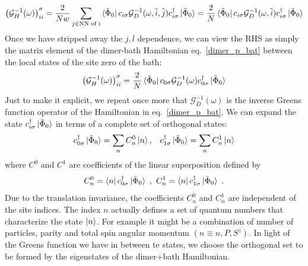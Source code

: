\documentclass{article}
\numberwithin{equation}{section}
\begin{document}
\begin{gather}
	\left(\mathcal{G}_{H}^{-1}(\omega)\right)_{ii}^\sigma = \frac{2}{Nw}\sum_{j \in \text{NN of i}}\bra{\tilde \Phi_0}c_{i\sigma}\mathcal{G}_{D}^{-1}(\omega, \tilde i, \tilde j)c^\dagger_{i\sigma}\ket{\tilde \Phi_0} = \frac{2}{N}\bra{\tilde \Phi_0}c_{i\sigma}\mathcal{G}_{D}^{-1}(\omega, \tilde i)c^\dagger_{i\sigma}\ket{\tilde \Phi_0}
\end{gather}
Once we have stripped away the \(j,l\) dependence, we can view the RHS as simply the matrix element of the dimer-bath Hamiltonian eq.~\ref{dimer_p_bat} between the local states of the site zero of the bath:
\begin{gather}
	\label{local_gf}
	\left(\mathcal{G}_{H}^{-1}(\omega)\right)_{ii}^\sigma = \frac{2}{N}\bra{\tilde \Phi_0}c_{0\sigma}\mathcal{G}_{D}^{-1}(\omega)c^\dagger_{0\sigma}\ket{\tilde \Phi_0}
\end{gather}
Just to make it explicit, we repeat once more that \(\mathcal{G}_{D}^{-1}(\omega)\) is the inverse Greens function operator of the Hamiltonian in eq.~\ref{dimer_p_bat}.
We can expand the state $c^\dagger_{i\sigma}\ket{\tilde \Phi_0}$ in terms of a complete set of orthogonal states:
\begin{equation}\begin{aligned}
	c^\dagger_{0\sigma}\ket{\tilde \Phi_0} = \sum_n C^0_n \ket{n}, && c^\dagger_{1\sigma}\ket{\tilde \Phi_0} = \sum_n C^1_n \ket{n}%
\end{aligned}\end{equation}
where $C^{0}$ and $C^{1}$ are coefficients of the linear superposition defined by
\begin{equation}
C^{0}_{n} = \bra{n} c^\dagger_{0\sigma}\ket{\tilde \Phi_0}~,~ C^{1}_{n} = \bra{n} c^\dagger_{1\sigma}\ket{\tilde \Phi_0}~.
\end{equation}
Due to the translation invariance, the coefficients $C^{0}_{n}$ and $C^{1}_{n}$ are independent of the site indices. The index $n$ actually defines a set of quantum numbers that characterize the state $\ket{n}$. For example it might be a combination of number of particles, parity and total spin angular momentum $(n \equiv n, P, S^z)$. In light of the Greens function we have in between te states, we choose the orthogonal set to be formed by the eigenstates of the dimer+bath Hamiltonian.
\end{document}
